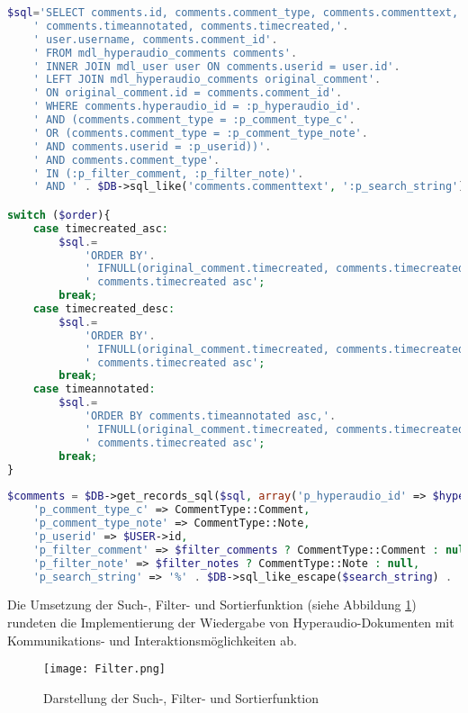 \begin{lstlisting}[language=php,
             linewidth=\textwidth,
             caption={Ausschnitt der \textbf{external.php} in der 11. Iteration},
             label={lst:it11:external}]
$sql='SELECT comments.id, comments.comment_type, comments.commenttext,'.
    ' comments.timeannotated, comments.timecreated,'.
    ' user.username, comments.comment_id'.
    ' FROM mdl_hyperaudio_comments comments'.
    ' INNER JOIN mdl_user user ON comments.userid = user.id'.
    ' LEFT JOIN mdl_hyperaudio_comments original_comment'.
    ' ON original_comment.id = comments.comment_id'.
    ' WHERE comments.hyperaudio_id = :p_hyperaudio_id'.
    ' AND (comments.comment_type = :p_comment_type_c'.
    ' OR (comments.comment_type = :p_comment_type_note'.
    ' AND comments.userid = :p_userid))'.
    ' AND comments.comment_type'.
    ' IN (:p_filter_comment, :p_filter_note)'.
    ' AND ' . $DB->sql_like('comments.commenttext', ':p_search_string');

switch ($order){
    case timecreated_asc:
        $sql.= 
            'ORDER BY'.
            ' IFNULL(original_comment.timecreated, comments.timecreated) asc,'.
            ' comments.timecreated asc';
        break;
    case timecreated_desc:
        $sql.= 
            'ORDER BY'.
            ' IFNULL(original_comment.timecreated, comments.timecreated) desc,'.
            ' comments.timecreated asc';
        break;
    case timeannotated:
        $sql.=
            'ORDER BY comments.timeannotated asc,'.
            ' IFNULL(original_comment.timecreated, comments.timecreated) asc,'.
            ' comments.timecreated asc';
        break;
}
        
$comments = $DB->get_records_sql($sql, array('p_hyperaudio_id' => $hyperaudio_id,
    'p_comment_type_c' => CommentType::Comment,
    'p_comment_type_note' => CommentType::Note,
    'p_userid' => $USER->id,
    'p_filter_comment' => $filter_comments ? CommentType::Comment : null,
    'p_filter_note' => $filter_notes ? CommentType::Note : null,
    'p_search_string' => '%' . $DB->sql_like_escape($search_string) . '%'));
\end{lstlisting}

Die Umsetzung der Such-, Filter- und Sortierfunktion (siehe Abbildung \ref{fig:Filter}) rundeten die Implementierung der Wiedergabe von Hyperaudio-Dokumenten mit Kommunikations- und Interaktionsmöglichkeiten ab.

\begin{figure}[h!]
\texttt{[image: Filter.png]}
\caption{\label{fig:Filter}Darstellung der Such-, Filter- und Sortierfunktion}
\end{figure}


